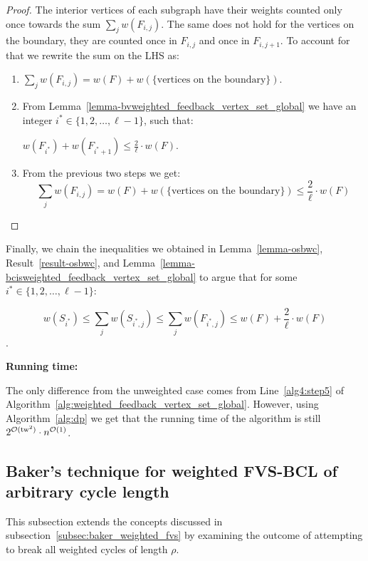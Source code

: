 \begin{proof}
    
    The interior vertices of each subgraph have their weights counted only once towards the sum 
    $\sum\limits_j w(F_{i, j})$. The same does not hold for the vertices on the boundary, they are counted 
    once in $F_{i, j}$ and once in $F_{i, j+1}$. To account for that we rewrite the sum on the LHS as:

    \begin{enumerate}
        \item $\sum\limits_j w(F_{i, j}) = w(F) + w(\{\text{vertices on the boundary}\})$.
        \item From Lemma~\ref{lemma-bvweighted_feedback_vertex_set_global} we have an integer $i^* \in \{1, 2, \dots, \ell-1\}$, such that:
        
        $w(F_{i^*}) + w(F_{i^* + 1}) \leq \frac{2}{\ell} \cdot w(F)$.
        \item From the previous two steps we get:
        \[\sum\limits_j w(F_{i, j}) =
        w(F) + w(\{\text{vertices on the boundary}\}) \leq
        \frac{2}{\ell} \cdot w(F)
        \]
    \end{enumerate}

\end{proof}

 Finally, we chain the inequalities we obtained in Lemma~\ref{lemma-osbwc}, Result~\ref{result-osbwc}, 
and Lemma~\ref{lemma-bcisweighted_feedback_vertex_set_global} to argue that for some $i^* \in \{1, 2, \dots, \ell-1\}$: 

\[w(S_{i^*}) \leq \sum\limits_j w(S_{i^*, j}) \leq \sum\limits_j w(F_{i^*, j}) \leq w(F) + \frac{2}{\ell} \cdot w(F)\].

 \textbf{Running time:}

The only difference from the unweighted case comes from Line~\ref{alg4:step5} of 
Algorithm~\ref{alg:weighted_feedback_vertex_set_global}. However, using Algorithm~\ref{alg:dp} 
we get that the running time of the algorithm is still $2^{\mathcal{O}(\operatorname{tw}^2)} \cdot n^{\mathcal{O}(1)}$.

\subsection{Baker's technique for weighted FVS-BCL of arbitrary cycle length}
\label{subsec:weighted_arbitrary_length}

This subsection extends the concepts discussed in subsection~\ref{subsec:baker_weighted_fvs} 
by examining the outcome of attempting to break all weighted cycles of length $\rho$. 

